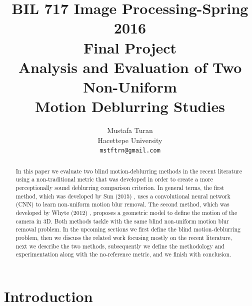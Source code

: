 \documentclass[10pt,twocolumn,letterpaper]{article}
\begin{document}
\title{BIL 717 Image Processing-Spring 2016\\
Final Project\\
Analysis and Evaluation of Two Non-Uniform\\
Motion Deblurring Studies}

\author{Mustafa Turan\\
Hacettepe University\\
{\tt\small mstftrn@gmail.com}}


\maketitle

\begin{abstract}
In this paper we evaluate two blind motion-deblurring methods in the recent literature using a non-traditional metric that was developed in order to create a more perceptionally sound deblurring comparison criterion. In general terms, the first method, which was developed by Sun \etal (2015) \cite{sun2015learning}, uses a convolutional neural network (CNN) to learn non-uniform motion blur removal. The second method, which was developed by Whyte \etal (2012) \cite{whyte2012non}, proposes a geometric model to define the motion of the camera in 3D. Both methods tackle with the same blind non-uniform motion blur removal problem. In the upcoming sections we first define the blind motion-deblurring problem, then we discuss the related work focusing mostly on the recent literature, next we describe the two methods, subsequently we define the methodology and experimentation along with the no-reference metric, and we finish with conclusion.
\end{abstract}

\section{Introduction}
\end{document}
